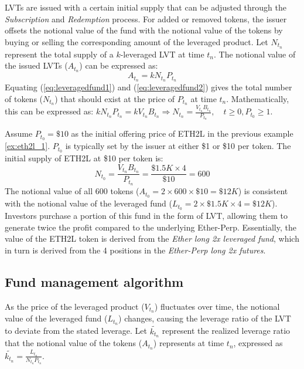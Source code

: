 LVTs are issued with a certain initial supply that can be adjusted through the \textsl{Subscription} and \textsl{Redemption} process. For added or removed tokens, the issuer offsets the notional value of the fund with the notional value of the tokens by buying or selling the corresponding amount of the leveraged product. Let $N_{t_{n}}$ represent the total supply of a $k$-leveraged LVT at time $t_{n}$. The notional value of the issued LVTs ($A_{t_{n}}$) can be expressed as:
\begin{equation}\label{eq:leveragedfund2}
	A_{t_{n}}=kN_{t_{n}}P_{t_{n}}
\end{equation}
Equating (\ref{eq:leveragedfund1}) and (\ref{eq:leveragedfund2}) gives the total number of tokens ($N_{t_{n}}$) that should exist at the price of $P_{t_{n}}$ at time $t_{n}$. Mathematically, this can be expressed as: $kN_{t_{n}}P_{t_{n}}=kV_{t_{n}}B_{t_{n}} \Rightarrow  N_{t_{n}}=\frac{V_{t_{n}}B_{t_{n}}}{P_{t_{n}}},\quad t \ge 0, P_{t_{0}} \ge 1$.

\begin{example}\label{ex:eth2l_2}
	Assume $P_{t_{0}}=\$10$ as the initial offering price of ETH2L in the previous example \ref{ex:eth2l_1}. $P_{t_{0}}$ is typically set by the issuer at either \$1 or \$10 per token. The initial supply of ETH2L at \$10 per token is:
	\begin{equation*}
		N_{t_{0}}=\frac{V_{t_{n}}B_{t_{n}}}{P_{t_{n}}}=\frac{\$1.5K\times{4}}{\$10}=600
	\end{equation*}
	The notional value of all 600 tokens ($A_{t_{0}}=2\times{600}\times{\$10}=\$12K$) is consistent with the notional value of the leveraged fund ($L_{t_{0}}=2\times{\$1.5K}\times{4}=\$12K$). Investors purchase a portion of this fund in the form of LVT, allowing them to generate twice the profit compared to the underlying Ether-Perp. Essentially, the value of the ETH2L token is derived from the \textsl{Ether long 2x leveraged fund}, which in turn is derived from the 4 positions in the \textsl{Ether-Perp long 2x futures}.
\end{example}

\subsection{Fund management algorithm}\label{subsec:fundmgmt}
As the price of the leveraged product ($V_{t_{n}}$) fluctuates over time, the notional value of the leveraged fund ($L_{t_{n}}$) changes, causing the leverage ratio of the LVT to deviate from the stated leverage. Let $\tilde{k_{t_{n}}}$ represent the realized leverage ratio that the notional value of the tokens ($A_{t_{n}}$) represents at time $t_{n}$, expressed as $\tilde{k_{t_{n}}}=\frac{L_{t_{n}}}{N_{t_{n}}P_{t_{n}}}$.

